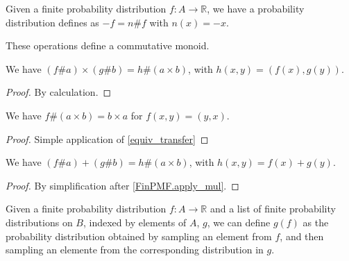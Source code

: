 \begin{definition}
    \label{instNegFinPMF}
    \leanok
    Given a finite probability distribution $f: A \to \mathbb{R}$, we have a probability distribution
    defines as $-f = n \# f$ with $n(x) = -x$.
\end{definition}

\begin{proposition}
    \label{FinPMFCommMonoid}
    \leanok
    These operations define a commutative monoid.
\end{proposition}


\begin{lemma}
    \label{FinPMF.apply_mul}
    \leanok
    We have $(f \# a) \times (g \# b) = h \# (a \times b)$, with $h(x, y) = (f(x), g(y))$.
\end{lemma}

\begin{proof}
    \leanok
    By calculation.
\end{proof}

\begin{lemma}
    \label{FinPMF.apply_swap}
    \leanok
    We have $f \# (a \times b) = b \times a$ for $f(x, y) = (y, x)$.
\end{lemma}

\begin{proof}
    \leanok
    Simple application of \ref{equiv_transfer}
\end{proof}

\begin{lemma}
    \label{FinPMF.apply_add}
    \leanok
    We have $(f \# a) + (g \# b) = h \# (a \times b)$, with $h(x, y) = f(x) + g(y)$.
\end{lemma}

\begin{proof}
    \leanok
    By simplification after \ref{FinPMF.apply_mul}.
\end{proof}

\begin{definition}
    \label{FinPMF.linear_combination}
    \leanok
    Given a finite probability distribution $f: A \to \mathbb{R}$ and a list of finite probability distributions on $B$, indexed by
    elements of $A$, $g$, we can define $g(f)$ as the probability distribution obtained by sampling an element from $f$, and then
    sampling an elemente from the corresponding distribution in $g$.
\end{definition}


